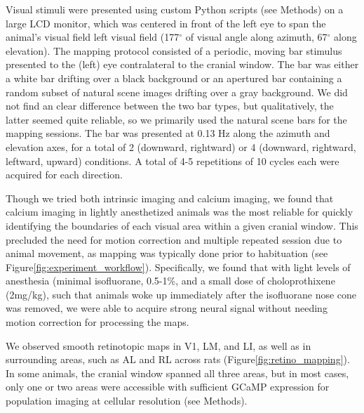 Visual stimuli were presented using custom Python scripts (see Methods) on a large LCD monitor, which was centered in front of the left eye to span the animal's visual field left visual field (177$^{\circ}$ of visual angle along azimuth, 67$^{\circ}$ along elevation). The mapping protocol consisted of a periodic, moving bar stimulus\cite{Kalatsky2003, Marshel2011} presented to the (left) eye contralateral to the cranial window. The bar was either a white bar drifting over a black background or an apertured bar containing a random subset of natural scene images drifting over a gray background. We did not find an clear difference between the two bar types, but qualitatively, the latter seemed quite reliable, so we primarily used the natural scene bars for the mapping sessions. The bar was presented at 0.13 Hz along the azimuth and elevation axes, for a total of 2 (downward, rightward) or 4 (downward, rightward, leftward, upward) conditions. A total of 4-5 repetitions of 10 cycles each were acquired for each direction. 

Though we tried both intrinsic imaging and calcium imaging, we found that calcium imaging in lightly anesthetized animals was the most reliable for quickly identifying the boundaries of each visual area within a given cranial window. This precluded the need for motion correction and multiple repeated session due to animal movement, as mapping was typically done prior to habituation (see Figure\ref{fig:experiment_workflow}). Specifically, we found that with light levels of anesthesia (minimal isofluorane, 0.5-1\%, and a small dose of choloprothixene (2mg/kg), such that animals woke up immediately after the isofluorane nose cone was removed, we were able to acquire strong neural signal without needing motion correction for processing the maps.

We observed smooth retinotopic maps in  V1, LM, and LI, as well as in surrounding areas, such as AL and RL across rats (Figure\ref{fig:retino_mapping}). In some animals, the cranial window spanned all three areas, but in most cases, only one or two areas were accessible with sufficient GCaMP expression for population imaging at cellular resolution (see Methods).

